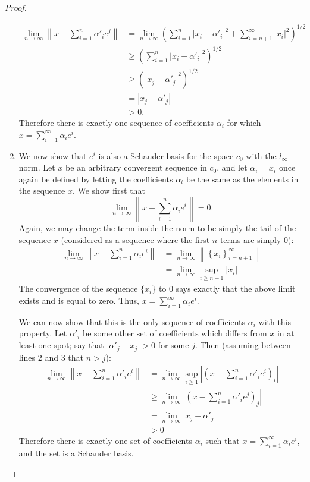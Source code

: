 \documentclass[12pt]{article}
\theoremstyle{definition}
\begin{document}
\begin{proof}
\begin{enumerate}[label=(\roman*)]
		\begin{align*}
			\lim_{n\to \infty} \left \lVert { x - \sum_{i=1}^n \alpha'_i e^j } \right \rVert &= \lim_{n\to \infty} \left( \sum_{i=1}^n \left \lvert { x_i - \alpha'_i } \right \lvert ^2 + \sum_{i=n+1}^\infty \left \lvert { x_i } \right \lvert ^2 \right)^{1/2}	\\
			&\geq \left( \sum_{i=1}^n \left \lvert { x_i - \alpha'_i } \right \lvert ^2  \right)^{1/2}\\
			&\geq \left( \left \lvert { x_j - \alpha'_j } \right \lvert ^2 \right)^{1/2}\\
			&= \left \lvert { x_j - \alpha'_j } \right \lvert \\
			&> 0.
		\end{align*}
		Therefore there is exactly one sequence of coefficients $\alpha_i$ for which $x = \sum_{i=1}^\infty \alpha_ie^i$.
	\item We now show that $e^i$ is also a Schauder basis for the space $c_0$ with the $l_\infty $ norm. Let $x$ be an arbitrary convergent sequence in $c_0$, and let $\alpha_i = x_i$ once again be defined by letting the coefficients $\alpha_i$ be the same as the elements in the sequence $x$. We show first that 
		\[ \lim_{n\to \infty} \left \lVert { x - \sum_{i=1}^n \alpha_i e^i } \right \lVert = 0.\]
Again, we may change the term inside the norm to be simply the tail of the sequence $x$ (considered as a sequence where the first $n$ terms are simply $0$):
		\begin{align*}
		\lim_{n\to \infty} \left \lVert { x - \sum_{i=1}^n \alpha_i e^i } \right \lVert &= \lim_{n\to \infty} \left \lVert { \left\{ x_i \right\}_{i=n+1}^\infty } \right \lVert \\
		&= \lim_{n\to\infty}\sup_{i \geq n+1} \left \lvert { x_i } \right \lvert 
	\end{align*}
	The convergence of the sequence $\{x_i\}$ to $0$ says exactly that the above limit exists and is equal to zero. Thus, $x = \sum_{i=1}^\infty \alpha_i e^i$.
	\par We can now show that this is the only sequence of coefficients $\alpha_i$ with this property. Let $\alpha'_i$ be some other set of coefficients which differs from $x$ in at least one spot; say that $\lvert \alpha'_j - x_j\rvert > 0 $ for some $j$. Then (assuming between lines $2$ and $3$ that $n > j$):
	\begin{align*}
		\lim_{n \to \infty}\left \lVert { x - \sum_{i=1}^n \alpha'_i e^i } \right \lVert  &= \lim_{n \to \infty} \sup_{i \geq 1} \left \lvert { \left (x - \sum_{i=1}^n \alpha'_i e^i   \right )_i} \right \rvert \\
		&\geq \lim_{n\to \infty} \left \lvert \left( x - \sum_{i=1}^n \alpha'_i e^j\right)_j\right \rvert\\
	&= \lim_{n \to \infty} \left \lvert { x_j - \alpha'_j } \right \lvert \\
	&> 0
	\end{align*}
	Therefore there is exactly one set of coefficients $\alpha_i$ such that $x = \sum_{i=1}^\infty \alpha_i e^i$, and the set is a Schauder basis.	
	\end{enumerate}
\end{proof}
\end{document}
